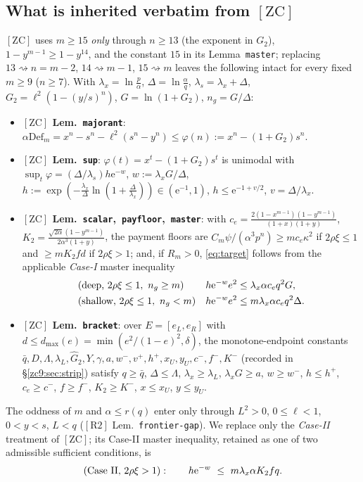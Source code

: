 \documentclass[11pt]{amsart}
\newcommand{\eu}{\mathrm{e}}
\newcommand{\Def}{\mathrm{Def}}
\newcommand{\RII}{[\textrm{R2}]}
\newcommand{\ZC}{[\textrm{ZC}]}
\begin{document}
\subsection*{What is inherited verbatim from $\ZC$}
$\ZC$ uses $m\ge15$ \emph{only} through $n\ge13$ (the exponent in $G_2$),
$1-y^{m-1}\ge1-y^{14}$, and the constant $15$ in its Lemma~\texttt{master};
replacing $13\rightsquigarrow n=m-2$, $14\rightsquigarrow m-1$,
$15\rightsquigarrow m$ leaves the following intact for every fixed $m\ge9$
($n\ge7$).  With
$\lambda_x=\ln\tfrac p\alpha$, $\Delta=\ln\tfrac\alpha q$,
$\lambda_s=\lambda_x+\Delta$, $G_2=\ell^2(1-(y/s)^{n})$, $G=\ln(1+G_2)$,
$n_g=G/\Delta$:
\begin{itemize}
\item \textbf{$\ZC$ Lem.~\texttt{majorant}}:
 $\alpha\Def_m=x^n-s^n-\ell^2(s^n-y^n)\le\varphi(n):=x^n-(1+G_2)s^n$.
\item \textbf{$\ZC$ Lem.~\texttt{sup}}: $\varphi(t)=x^t-(1+G_2)s^t$ is unimodal
 with $\sup_t\varphi=(\Delta/\lambda_s)h\eu^{-w}$, $w:=\lambda_xG/\Delta$,
 $h:=\exp(-\tfrac{\lambda_x}\Delta\ln(1+\tfrac\Delta{\lambda_x}))\in(\eu^{-1},1)$,
 $h\le\eu^{-1+v/2}$, $v=\Delta/\lambda_x$.
\item \textbf{$\ZC$ Lem.~\texttt{scalar},~\texttt{payfloor},~\texttt{master}}:
 with $c_e=\tfrac{2(1-x^{m-1})(1-y^{m-1})}{(1+x)(1+y)}$,
 $K_2=\tfrac{\sqrt{2\alpha}(1-y^{m-1})}{2\alpha^3(1+y)}$, the payment floors are
 $C_m\psi/(\alpha^3p^{n})\ge m c_e\kappa^2$ if $2\rho\xi\le1$ and $\ge mK_2fd$ if
 $2\rho\xi>1$; and, if $R_m>0$, \eqref{eq:target} follows from the applicable
 \emph{Case-I} master inequality
 \begin{align}
  &\textup{(deep,}\ 2\rho\xi\le1,\ n_g\ge m)&
   h\eu^{-w}e^2&\le\lambda_x\alpha c_e q^2G,\label{zc9:eq:SCdeep}\\
  &\textup{(shallow,}\ 2\rho\xi\le1,\ n_g<m)&
   h\eu^{-w}e^2&\le m\lambda_x\alpha c_e q^2\Delta.\label{zc9:eq:SCsh}
 \end{align}
\item \textbf{$\ZC$ Lem.~\texttt{bracket}}: over $E=[e_L,e_R]$ with
 $d\le d_{\max}(e)=\min(e^2/(1-e)^2,\delta)$, the monotone-endpoint constants
 $\bar q,D,\Lambda,\lambda_L,\widehat G_2,Y,\gamma,a,w^-,v^+,h^+,x_U,y_U,c^-,f^-,K^-$
 (recorded in \S\ref{zc9:sec:strip}) satisfy $q\ge\bar q$, $\Delta\le\Lambda$,
 $\lambda_x\ge\lambda_L$, $\lambda_xG\ge a$, $w\ge w^-$, $h\le h^+$,
 $c_e\ge c^-$, $f\ge f^-$, $K_2\ge K^-$, $x\le x_U$, $y\le y_U$.
\end{itemize}
The oddness of $m$ and $\alpha\le r(q)$ enter only through $L^2>0$,
$0\le\ell<1$, $0<y<s$, $L<q$ ($\RII$ Lem.~\texttt{frontier-gap}).  We replace
only the \emph{Case-II} treatment of $\ZC$; its Case-II master inequality,
retained as one of two admissible sufficient conditions, is
\begin{equation}\label{zc9:eq:SCII-old}
 \textup{(Case II, }2\rho\xi>1):\qquad h\eu^{-w}\ \le\ m\lambda_x\alpha K_2 f q .
\end{equation}
\end{document}
